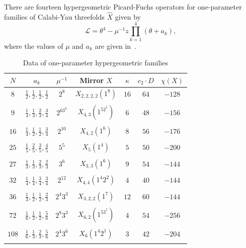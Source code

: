 \documentclass[10pt,oldfontcommands,oneside]{memoir}
\theoremstyle{definition}
\theoremstyle{remark}
\theoremstyle{plain}
\theoremstyle{definition}
\theoremstyle{remark}
\newcommand{\mc}[1]{\mathcal{#1}}
\newcommand{\1}{\mathbf{1}}
\newcommand{\2}{\mathbf{2}}
\newcommand{\3}{\mathbf{3}}
\begin{document}
There are fourteen hypergeometric Picard-Fuchs operators for one-parameter families of Calabi-Yau threefolds $\hat{X}$ given by
\[ \mc{L} = \theta^4 - \mu^{-1}z \prod_{k=1}^4 (\theta + a_k), \]
where the values of $\mu$ and $a_k$ are given in~.
\begin{table}[htpb]
    \centering
    \caption{Data of one-parameter hypergeometric families}
    \label{tab:oneparameter}
    \begin{tabular}{ccccccc}
        \toprule
        $N$ & $a_k$ & $\mu^{-1}$ & Mirror $X$ & $\kappa$ & $c_2 \cdot D$ & $\chi(X)$ \\
        \midrule
        $8$ & $\frac{1}{2},\frac{1}{2},\frac{1}{2},\frac{1}{2}$ & $2^8$ & $X_{2,2,2,2}(1^8)$ & $16$ & $64$ & $-128$ \\
        \\[-0.8em]
        $9$ & $\frac{1}{4},\frac{1}{3},\frac{2}{3},\frac{3}{4}$ & $2^63^3$ & $X_{4,3}(1^52^1)$ & $6$ & $48$ & $-156$ \\
        \\[-0.8em]
        $16$ & $\frac{1}{4},\frac{1}{2},\frac{1}{2},\frac{3}{4}$ & $2^{10}$ & $X_{4,2}(1^6)$ & $8$ & $56$ & $-176$ \\
        \\[-0.8em]
        $25$ & $\frac{1}{5},\frac{2}{5},\frac{3}{5},\frac{4}{5}$ & $5^5$ & $X_{5}(1^4)$ & $5$ & $50$ & $-200$ \\
        \\[-0.8em]
        $27$ & $\frac{1}{3},\frac{1}{3},\frac{2}{3},\frac{2}{3}$ & $3^6$ & $X_{3,3}(1^6)$ & $9$ & $54$ & $-144$ \\
        \\[-0.8em]
        $32$ & $\frac{1}{4},\frac{1}{4},\frac{3}{4},\frac{3}{4}$ & $2^{12}$ & $X_{4,4}(1^4 2^2)$ & $4$ & $40$ & $-144$ \\
        \\[-0.8em]
        $36$ & $\frac{1}{3},\frac{1}{2},\frac{1}{2},\frac{2}{3}$ & $2^4 3^3$ & $X_{3,2,2}(1^7)$ & $12$ & $60$ & $-144$ \\
        \\[-0.8em]
        $72$ & $\frac{1}{6},\frac{1}{2},\frac{1}{2},\frac{5}{6}$ & $2^{8}3^3$ & $X_{6,2}(1^53^1)$ & $4$ & $54$ & $-256$ \\
        \\[-0.8em]
        $108$ & $\frac{1}{6},\frac{1}{3},\frac{2}{3},\frac{5}{6}$ & $2^{4}3^6$ & $X_6(1^4 2^1)$ & $3$ & $42$ & $-204$ \\
        \\[-0.8em]

\end{tabular}
\end{table}
\end{document}
